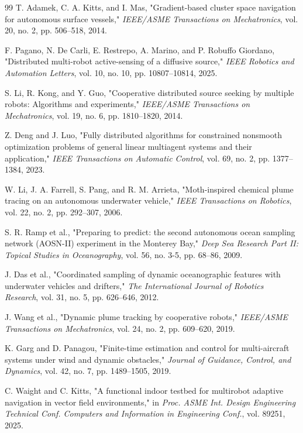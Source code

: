 \documentclass[lettersize,journal]{IEEEtran}
\begin{document}
\begin{thebibliography}{99}
 T. Adamek, C. A. Kitts, and I. Mas, "Gradient-based cluster space navigation for autonomous surface vessels," \textit{IEEE/ASME Transactions on Mechatronics}, vol. 20, no. 2, pp. 506--518, 2014.

 F. Pagano, N. De Carli, E. Restrepo, A. Marino, and P. Robuffo Giordano, "Distributed multi-robot active-sensing of a diffusive source," \textit{IEEE Robotics and Automation Letters}, vol. 10, no. 10, pp. 10807--10814, 2025.

 S. Li, R. Kong, and Y. Guo, "Cooperative distributed source seeking by multiple robots: Algorithms and experiments," \textit{IEEE/ASME Transactions on Mechatronics}, vol. 19, no. 6, pp. 1810--1820, 2014.

 Z. Deng and J. Luo, "Fully distributed algorithms for constrained nonsmooth optimization problems of general linear multiagent systems and their application," \textit{IEEE Transactions on Automatic Control}, vol. 69, no. 2, pp. 1377--1384, 2023.

 W. Li, J. A. Farrell, S. Pang, and R. M. Arrieta, "Moth-inspired chemical plume tracing on an autonomous underwater vehicle," \textit{IEEE Transactions on Robotics}, vol. 22, no. 2, pp. 292--307, 2006.

 S. R. Ramp et al., "Preparing to predict: the second autonomous ocean sampling network (AOSN-II) experiment in the Monterey Bay," \textit{Deep Sea Research Part II: Topical Studies in Oceanography}, vol. 56, no. 3-5, pp. 68--86, 2009.

 J. Das et al., "Coordinated sampling of dynamic oceanographic features with underwater vehicles and drifters," \textit{The International Journal of Robotics Research}, vol. 31, no. 5, pp. 626--646, 2012.

 J. Wang et al., "Dynamic plume tracking by cooperative robots," \textit{IEEE/ASME Transactions on Mechatronics}, vol. 24, no. 2, pp. 609--620, 2019.

 K. Garg and D. Panagou, "Finite-time estimation and control for multi-aircraft systems under wind and dynamic obstacles," \textit{Journal of Guidance, Control, and Dynamics}, vol. 42, no. 7, pp. 1489--1505, 2019.

 C. Waight and C. Kitts, "A functional indoor testbed for multirobot adaptive navigation in vector field environments," in \textit{Proc. ASME Int. Design Engineering Technical Conf. Computers and Information in Engineering Conf.}, vol. 89251, 2025.


\end{thebibliography}
\end{document}
